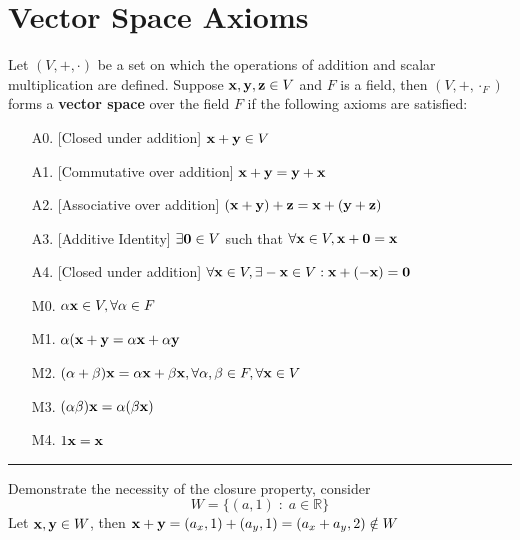 \section*{Vector Space Axioms}
\begin{definition}
Let $(V, +, \cdot)$ be a set on which the operations of addition and scalar multiplication are defined.  Suppose ${\bf x}, {\bf y}, {\bf z} \in V$ and $F$ is a field, then $(V, +, \cdot_F)$ forms a \textbf{vector space} over the field $F$ if the following axioms are satisfied:  
	\begin{tcolorbox}[colback=yellow!10!,colframe=gray!15!]

\begin{enumerate}
	\item[A0. ] [Closed under addition]   ${\bf x}+{\bf y} \in V$
	\item[A1. ] [Commutative over addition]   ${\bf x}+{\bf y} = {\bf y}+{\bf x} $
	\item[A2. ] [Associative over addition]   $({\bf x}+{\bf y}) + {\bf z}= {\bf x}+({\bf y} + {\bf z})$
	\item[A3. ] [Additive Identity]   $\exists {\bf 0} \in V$ such that $\forall {\bf x} \in V, {\bf x} + {\bf 0} = {\bf x}$
	\item[A4. ] [Closed under addition]   $\forall {\bf x} \in V, \exists -{\bf x} \in V: {\bf x } + (-{\bf x}) = {\bf 0}$
	\item[M0. ]    $\alpha {\bf x} \in V, \forall \alpha \in F$
	\item[M1. ]    $\alpha ({\bf x}+{\bf y} = \alpha {\bf x} + \alpha {\bf y}$
	\item[M2. ]  $(\alpha + \beta) {\bf x} = \alpha {\bf x} + \beta {\bf x}, \forall \alpha, \beta \in F, \forall {\bf x} \in V$
	\item[M3. ]  $(\alpha \beta) {\bf x} = \alpha (\beta {\bf x})$
	\item[M4. ] $1{\bf x} = {\bf x}$

\end{enumerate}
	 
	\end{tcolorbox}
	
\end{definition}
	
\rule[0.01in]{\textwidth}{0.0025in}
\begin{example}
Demonstrate the necessity of the closure property, consider
\[ W = \{ (a,1)  \;  : \; a \in \mathbb{R}  \} \]
Let ${\bf x}, {\bf y} \in W$, then ${\bf x} + {\bf y} = (a_x, 1) + (a_y, 1) = (a_x+a_y, 2) \notin W$
\end{example}
	
